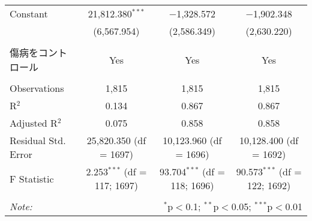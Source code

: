 \documentclass{jsarticle}
\begin{document}
\begin{table}[!htbp]
\begin{tabular}{@{\extracolsep{5pt}}lccc}
 Constant & 21,812.380$^{***}$ & $-$1,328.572 & $-$1,902.348 \\ 
  & (6,567.954) & (2,586.349) & (2,630.220) \\ 
  & & & \\ 
  傷病をコントロール & Yes & Yes & Yes \\
\hline \\[-1.8ex] 
Observations & 1,815 & 1,815 & 1,815 \\ 
R$^{2}$ & 0.134 & 0.867 & 0.867 \\ 
Adjusted R$^{2}$ & 0.075 & 0.858 & 0.858 \\ 
Residual Std. Error & 25,820.350 (df = 1697) & 10,123.960 (df = 1696) & 10,128.400 (df = 1692) \\ 
F Statistic & 2.253$^{***}$ (df = 117; 1697) & 93.704$^{***}$ (df = 118; 1696) & 90.573$^{***}$ (df = 122; 1692) \\ 
\hline 
\hline \\[-1.8ex] 
\textit{Note:}  & \multicolumn{3}{r}{$^{*}$p$<$0.1; $^{**}$p$<$0.05; $^{***}$p$<$0.01} \\ 
\end{tabular} 
\end{table} 
\end{document}
